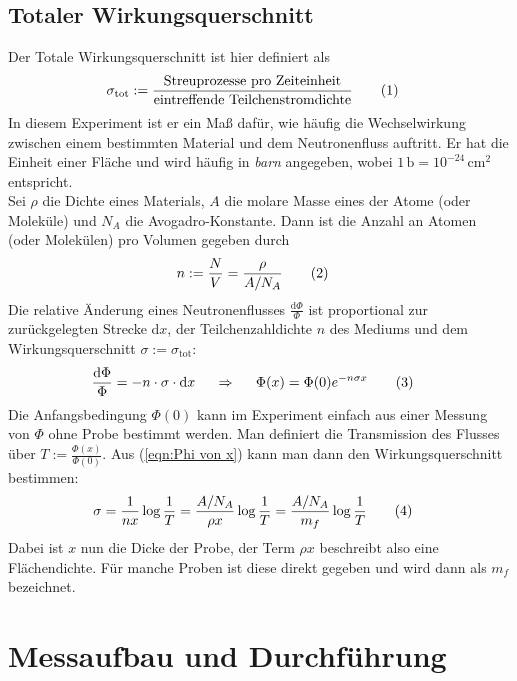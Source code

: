 \documentclass[german, parskip=full]{scrartcl}
\newcommand\numberthis{\addtocounter{equation}{1}\tag{\theequation}}
\newcommand{\tecxt}{}
\begin{document}
\subsection{Totaler Wirkungsquerschnitt}
Der Totale Wirkungsquerschnitt ist hier definiert als 
\begin{align*}
\sigma_\tecxt\text{tot}&:=\frac{\tecxt\text{Streuprozesse pro Zeiteinheit}}{\text{eintreffende Teilchenstromdichte}}\numberthis\label{eqn:Definition Wirkungsquerschnitt total}
\end{align*}
In diesem Experiment ist er ein Maß dafür, wie häufig die Wechselwirkung zwischen einem bestimmten Material und dem Neutronenfluss auftritt. Er hat die Einheit einer Fläche und wird häufig in \textsl{barn} angegeben, wobei $1\,\tecxt\text{b}=10^{-24}\,\tecxt\text{cm}^2$ entspricht.\\
Sei $\rho$ die Dichte eines Materials, $A$ die molare Masse eines der Atome (oder Moleküle) und $N_A$ die Avogadro-Konstante. Dann ist die Anzahl an Atomen (oder Molekülen) pro Volumen gegeben durch 
\begin{align*}
n&:=\frac{N}{V}=\frac{\rho}{A/N_A}\numberthis\label{eqn:Teilchenzahldichte Material}
\end{align*}
Die relative Änderung eines Neutronenflusses $\frac{\tecxt\text{d}\Phi}{\Phi}$ ist proportional zur zurückgelegten Strecke d$x$, der Teilchenzahldichte $n$ des Mediums und dem Wirkungsquerschnitt $\sigma:=\sigma_\tecxt\text{tot}$:
\begin{align*}
\frac{\tecxt\text{d}\Phi}{\Phi}&=-n\cdot\sigma\cdot\tecxt\text{d}x\ \ &\Rightarrow &\ \ &\Phi(x)&=\Phi(0)e^{-n\sigma x}\numberthis\label{eqn:Phi von x}
\end{align*}
Die Anfangsbedingung $\Phi(0)$ kann im Experiment einfach aus einer Messung von $\Phi$ ohne Probe bestimmt werden. Man definiert die Transmission des Flusses über $T:=\frac{\Phi(x)}{\Phi(0)}$. Aus (\ref{eqn:Phi von x}) kann man dann den Wirkungsquerschnitt bestimmen:
\begin{align*}
\sigma&=\frac{1}{nx}\log\frac{1}{T}=\frac{A/N_A}{\rho x}\log\frac{1}{T}=\frac{A/N_A}{m_f}\log\frac{1}{T}\numberthis\label{eqn:sigma von T}
\end{align*}
Dabei ist $x$ nun die Dicke der Probe, der Term $\rho x$ beschreibt also eine Flächendichte. Für manche Proben ist diese direkt gegeben und wird dann als $m_f$ bezeichnet.
\section{Messaufbau und Durchführung}
\end{document}
